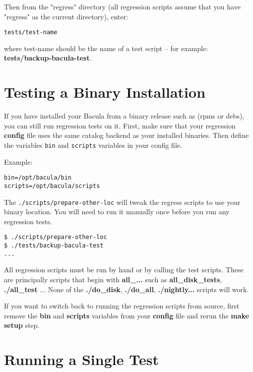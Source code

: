 Then from the "regress" directory (all regression scripts assume that
you have "regress" as the current directory), enter:

\begin{verbatim}
tests/test-name
\end{verbatim}

where test-name should be the name of a test script -- for example:
{\bf tests/backup-bacula-test}.

\section{Testing a Binary Installation}

If you have installed your Bacula from a binary release such as (rpms or debs),
you can still run regression tests on it.
First, make sure that your regression {\bf config} file uses the same catalog backend as
your installed binaries. Then define the variables \texttt{bin} and \texttt{scripts} variables
in your config file.

Example:
\begin{verbatim}
bin=/opt/bacula/bin
scripts=/opt/bacula/scripts
\end{verbatim}

The \texttt{./scripts/prepare-other-loc} will tweak the regress scripts to use
your binary location. You will need to run it manually once before you run any
regression tests.

\begin{verbatim}
$ ./scripts/prepare-other-loc
$ ./tests/backup-bacula-test
...
\end{verbatim}

All regression scripts must be run by hand or by calling the test scripts.
These are principally scripts that begin with {\bf all\_...} such as {\bf all\_disk\_tests},
{\bf ./all\_test} ...
None of the
{\bf ./do\_disk}, {\bf ./do\_all}, {\bf ./nightly...}  scripts will work.

If you want to switch back to running the regression scripts from source, first
remove the {\bf bin} and {\bf scripts} variables from your {\bf config} file and
rerun the {\bf make setup} step.

\section{Running a Single Test}

